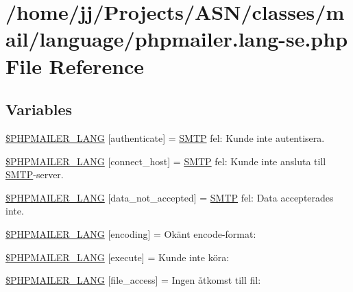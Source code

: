 \hypertarget{phpmailer_8lang-se_8php}{}\section{/home/jj/\+Projects/\+A\+S\+N/classes/mail/language/phpmailer.lang-\/se.php File Reference}
\label{phpmailer_8lang-se_8php}
\subsection*{Variables}
\begin{DoxyCompactItemize}
\item 
\hyperlink{phpmailer_8lang-se_8php_a2cb33073c989b85580748e331ed8b4aa}{\$\+P\+H\+P\+M\+A\+I\+L\+E\+R\+\_\+\+L\+A\+NG} \mbox{[}\textquotesingle{}authenticate\textquotesingle{}\mbox{]} = \textquotesingle{}\hyperlink{class_s_m_t_p}{S\+M\+TP} fel\+: Kunde inte autentisera.\textquotesingle{}
\item 
\hyperlink{phpmailer_8lang-se_8php_a2ee0cc637a06b96e45600db31c6799ee}{\$\+P\+H\+P\+M\+A\+I\+L\+E\+R\+\_\+\+L\+A\+NG} \mbox{[}\textquotesingle{}connect\+\_\+host\textquotesingle{}\mbox{]} = \textquotesingle{}\hyperlink{class_s_m_t_p}{S\+M\+TP} fel\+: Kunde inte ansluta till \hyperlink{class_s_m_t_p}{S\+M\+TP}-\/server.\textquotesingle{}
\item 
\hyperlink{phpmailer_8lang-se_8php_a814c6b191205d2361b3233e9c9d6fda5}{\$\+P\+H\+P\+M\+A\+I\+L\+E\+R\+\_\+\+L\+A\+NG} \mbox{[}\textquotesingle{}data\+\_\+not\+\_\+accepted\textquotesingle{}\mbox{]} = \textquotesingle{}\hyperlink{class_s_m_t_p}{S\+M\+TP} fel\+: Data accepterades inte.\textquotesingle{}
\item 
\hyperlink{phpmailer_8lang-se_8php_a817f7283f3d54c970a0c10305cc668cc}{\$\+P\+H\+P\+M\+A\+I\+L\+E\+R\+\_\+\+L\+A\+NG} \mbox{[}\textquotesingle{}encoding\textquotesingle{}\mbox{]} = \textquotesingle{}Okänt encode-\/format\+: \textquotesingle{}
\item 
\hyperlink{phpmailer_8lang-se_8php_a668217a9563a168f30f2a8548b6ed5a9}{\$\+P\+H\+P\+M\+A\+I\+L\+E\+R\+\_\+\+L\+A\+NG} \mbox{[}\textquotesingle{}execute\textquotesingle{}\mbox{]} = \textquotesingle{}Kunde inte köra\+: \textquotesingle{}
\item 
\hyperlink{phpmailer_8lang-se_8php_a7e83349023b856ef9e5c46e30ae6d51e}{\$\+P\+H\+P\+M\+A\+I\+L\+E\+R\+\_\+\+L\+A\+NG} \mbox{[}\textquotesingle{}file\+\_\+access\textquotesingle{}\mbox{]} = \textquotesingle{}Ingen åtkomst till fil\+: \textquotesingle{}

\end{DoxyCompactItemize}
